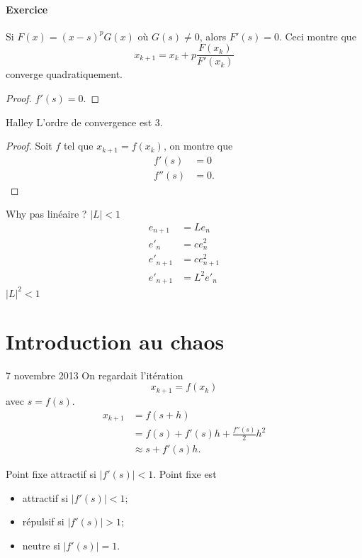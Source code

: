 \documentclass[11pt,a4paper]{article}
\theoremstyle{definition}
\begin{document}
\paragraph{Exercice}
Si
$F(x) = (x-s)^p G(x)$
où $G(s) \neq 0$, alors $F'(s) = 0$.
Ceci montre que
$$x_{k+1} = x_k + p\frac{F(x_k)}{F'(x_k)}$$
converge quadratiquement.
\begin{proof}
  $f'(s) = 0$.
\end{proof}

Halley
L'ordre de convergence est 3.
\begin{proof}
  Soit $f$ tel que $x_{k+1} = f(x_k)$, on montre que
  \begin{align*}
    f'(s) & = 0\\
    f''(s) & = 0.
  \end{align*}
\end{proof}

Why pas linéaire ?
$|L| < 1$
\begin{align*}
  e_{n+1} & = Le_n\\
  e'_n & = ce_n^2\\
  e'_{n+1} & = ce_{n+1}^2\\
  e'_{n+1} & = L^2e'_n
\end{align*}
$|L|^2 < 1$

\section{Introduction au chaos}
7 novembre 2013
On regardait l'itération
$$x_{k+1} = f(x_k)$$
avec $s = f(s)$.
\begin{align*}
  x_{k+1} & = f(s + h)\\
          & = f(s) + f'(s)h + \frac{f''(s)}{2}h^2\\
          & \approx s + f'(s)h.
\end{align*}

Point fixe attractif si $|f'(s)| < 1$.
Point fixe est
\begin{itemize}
  \item attractif si $|f'(s)| < 1$;
  \item répulsif si $|f'(s)| > 1$;
  \item neutre si $|f'(s)| = 1$.
\end{itemize}
\end{document}
